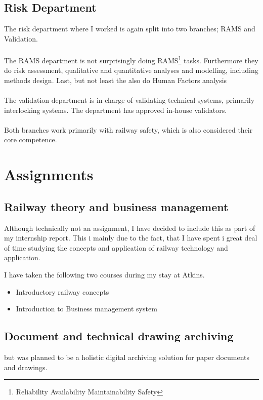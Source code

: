 \documentclass[11pt,a4paper,UKenglish]{article}
\begin{document}
\subsection{Risk Department}
The risk department where I worked is again split into two branches; RAMS and Validation.\\\\
The RAMS department is not surprisingly doing RAMS\footnote{Reliability Availability Maintainability Safety} tasks. Furthermore they do risk assessment, qualitative and quantitative analyses and modelling, including methods design. Last, but not least the also do Human Factors analysis\\\\
The validation department is in charge of validating technical systems, primarily interlocking systems. The department has approved in-house validators.\\\\
Both branches work primarily with railway safety, which is also considered their core competence.


\section{Assignments}

\subsection{Railway theory and business management}
Although technically not an assignment, I have decided to include this as part of my internship report. This i mainly due to the fact, that I have spent i great deal of time studying the concepts and application of railway technology and application.

I have taken the following two courses during my stay at Atkins.

\begin{itemize}
  \item Introductory railway concepts
  \item Introduction to Business management system
\end{itemize}


\subsection{Document and technical drawing archiving}
but was planned to be a holistic digital archiving solution for paper documents and drawings.
\end{document}
